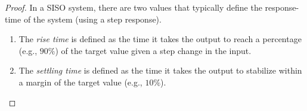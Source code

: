 \documentclass[a4paper,UKenglish]{lipics-v2018}
\begin{document}
\begin{proof}
In a SISO system, there are two values that typically define the
response-time of the system (using a step response).
%
\begin{enumerate}
%
\item The \emph{rise time} is defined as the time it takes the output to
reach a percentage (e.g., $90\%$) of the target value given a step change in
the input.
%
\item The \emph{settling time} is defined as the time it takes the output to
stabilize within a margin of the target value (e.g., $10\%$).
%
\end{enumerate} 
%


\end{proof}
\end{document}
